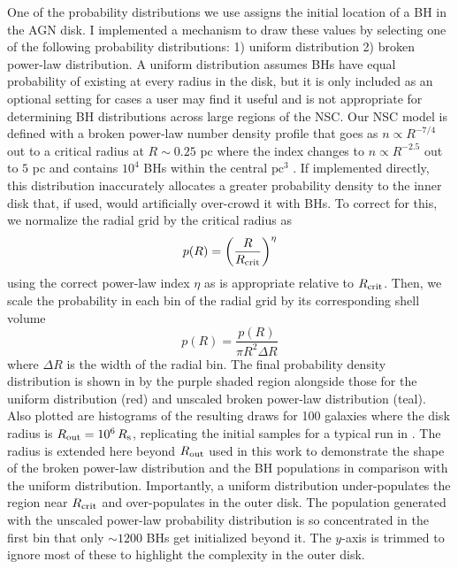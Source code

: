 One of the probability distributions we use assigns the initial location of a BH in the AGN disk.
I implemented a mechanism to draw these values by selecting one of the following probability distributions: 1) uniform distribution 2) broken power-law distribution.
A uniform distribution assumes BHs have equal probability of existing at every radius in the disk, but it is only included as an optional setting for cases a user may find it useful and is not appropriate for determining BH distributions across large regions of the NSC.
Our NSC model is defined with a broken power-law number density profile that goes as $n\propto R^{-7/4}$ out to a critical radius at $R\sim 0.25$ pc where the index changes to $n\propto R^{-2.5}$ out to $5$ pc and contains $10^4$ BHs within the central $\text{pc}^3$ \citep{Generozov+18}.
If implemented directly, this distribution inaccurately allocates a greater probability density to the inner disk that, if used, would artificially over-crowd it with BHs.
To correct for this, we normalize the radial grid by the critical radius as
\begin{equation}
	p(R) = \left( \frac{R}{R_{\rm crit}} \right)^\eta
\end{equation}
using the correct power-law index $\eta$ as is appropriate relative to $R_{\rm crit}$.
Then, we scale the probability in each bin of the radial grid by its corresponding shell volume
\begin{equation}
	p(R) = \frac{p(R)}{\pi R^2 \Delta R}
\end{equation}
where $\Delta R$ is the width of the radial bin.
The final probability density distribution is shown in  by the purple shaded region alongside those for the uniform distribution (red) and unscaled broken power-law distribution (teal).
Also plotted are histograms of the resulting draws for 100 galaxies where the disk radius is $R_{\rm out}=10^6\,R_{\rm s}$, replicating the initial samples for a typical run in \mcfacts.
The radius is extended here beyond $R_{\rm out}$ used in this work to demonstrate the shape of the broken power-law distribution and the BH populations in comparison with the uniform distribution.
Importantly, a uniform distribution under-populates the region near $R_{\rm crit}$ and over-populates in the outer disk.
The population generated with the unscaled power-law probability distribution is so concentrated in the first bin that only $\sim1200$ BHs get initialized beyond it.
The $y$-axis is trimmed to ignore most of these to highlight the complexity in the outer disk.




